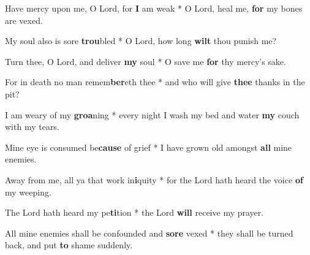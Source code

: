 \begin{multicols}{2}
	Have mercy upon me, O Lord, for \textbf{I} am weak * O Lord, heal me, \textbf{for} my bones are vexed.
	
	My soul also is sore \textbf{trou}bled * O Lord, how long \textbf{wilt} thou punish me?
	
	Turn thee, O Lord, and deliver \textbf{my} soul * O save me \textbf{for} thy mercy's sake.
	
	For in death no man remem\textbf{ber}eth thee * and who will give \textbf{thee} thanks in the pit?
	
	I am weary of my \textbf{groa}ning * every night I wash my bed and water \textbf{my} couch with my tears.
	
	Mine eye is consumed be\textbf{cause} of grief * I have grown old amongst \textbf{all} mine enemies.
	
	Away from me, all ya that work in\textbf{i}quity * for the Lord hath heard the voice \textbf{of} my weeping.
	
	The Lord hath heard my pe\textbf{ti}tion * the Lord \textbf{will} receive my prayer.
	
	All mine enemies shall be confounded and \textbf{sore} vexed * they shall be turned back, and put \textbf{to} shame suddenly.
\end{multicols}